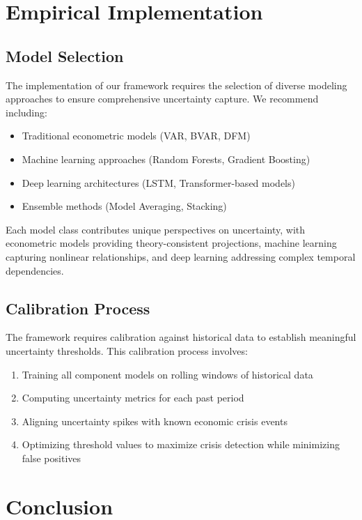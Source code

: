 \documentclass[5p,authoryear]{elsarticle}
\begin{document}
\section{Empirical Implementation}

\subsection{Model Selection}

The implementation of our framework requires the selection of diverse modeling approaches to ensure comprehensive uncertainty capture. We recommend including:

\begin{itemize}
    \item Traditional econometric models (VAR, BVAR, DFM)
    \item Machine learning approaches (Random Forests, Gradient Boosting)
    \item Deep learning architectures (LSTM, Transformer-based models)
    \item Ensemble methods (Model Averaging, Stacking)
\end{itemize}

Each model class contributes unique perspectives on uncertainty, with econometric models providing theory-consistent projections, machine learning capturing nonlinear relationships, and deep learning addressing complex temporal dependencies.

\subsection{Calibration Process}

The framework requires calibration against historical data to establish meaningful uncertainty thresholds. This calibration process involves:

\begin{enumerate}
    \item Training all component models on rolling windows of historical data
    \item Computing uncertainty metrics for each past period
    \item Aligning uncertainty spikes with known economic crisis events
    \item Optimizing threshold values to maximize crisis detection while minimizing false positives
\end{enumerate}

\section{Conclusion}
\end{document}
